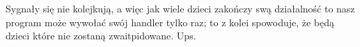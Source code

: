 Sygnały się nie kolejkują, a więc jak wiele dzieci zakończy swą działalność to nasz program może wywołać swój handler tylko raz; to z kolei spowoduje, że będą dzieci które nie zostaną zwaitpidowane. Ups.